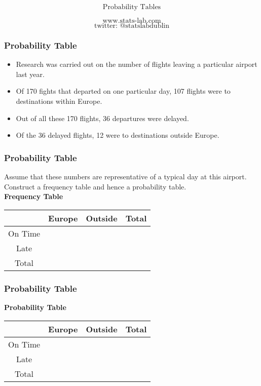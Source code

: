 \documentclass{beamer}
\begin{document}
\begin{frame}

{
\Huge
\[\mbox{Probability Tables} \]
}
{
\LARGE
\[\mbox{www.stats-lab.com} \]
\[ \mbox{twitter: @statslabdublin} \] 

}
\end{frame}

\begin{frame}
\frametitle{Probability Table}
\LARGE
\begin{itemize}
\item Research was carried out on the number of flights leaving a particular airport last year. 

\item Of 170 fights that departed on one particular day, 107 flights were to destinations within Europe. 
\item Out of all these 170 flights, 36 departures were delayed. 

\item Of the 36 delayed flights, 12 were to destinations outside Europe. 


\end{itemize}
\end{frame}
\begin{frame}
\frametitle{Probability Table}
\Large
Assume that these numbers are representative of a typical 
day at this airport. Construct a frequency table and hence a probability table.\\ \bigskip
\textbf{Frequency Table}\\ \bigskip
\begin{tabular}{|c|c|c||c|}
\hline  &  \phantom{sp} Europe \phantom{sp} & \phantom{sp} Outside \phantom{sp} &\phantom{sp} Total\phantom{sp}  \\ 
\hline On Time  &  &  &  \\ 
\hline Late &  &  &  \\ \hline
\hline Total  &  &  &  \\ 
\hline 
\end{tabular} 
\end{frame}



\begin{frame}
\frametitle{Probability Table}
\Large
\textbf{Probability Table} \\ \bigskip
\begin{tabular}{|c|c|c||c|}
\hline  &  \phantom{sp} Europe \phantom{sp} & \phantom{sp} Outside \phantom{sp} & \phantom{sp} Total\phantom{sp}  \\ 
\hline On Time  &  &  &  \\ 
\hline Late &  &  &  \\ \hline
\hline Total  &  &  &  \\ 
\hline 
\end{tabular} 
\end{frame}
\end{document}
